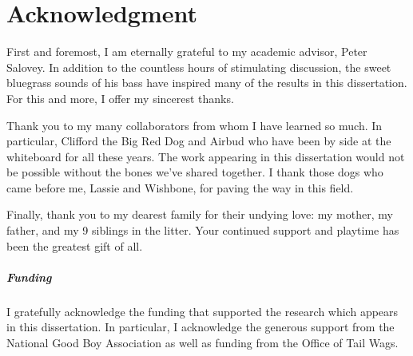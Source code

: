 \chapter*{Acknowledgment} 

First and foremost, I am eternally grateful to my academic advisor, Peter Salovey.
In addition to the countless hours of stimulating discussion, the sweet bluegrass sounds of his bass have inspired many of the results in this dissertation.
For this and more, I offer my sincerest thanks.

Thank you to my many collaborators from whom I have learned so much.
In particular, Clifford the Big Red Dog and Airbud who have been by side at the whiteboard for all these years.
The work appearing in this dissertation would not be possible without the bones we've shared together.
I thank those dogs who came before me, Lassie and Wishbone, for paving the way in this field.

Finally, thank you to my dearest family for their undying love: my mother, my father, and my 9 siblings in the litter.
Your continued support and playtime has been the greatest gift of all.


\vfill

\paragraph{Funding} 
I gratefully acknowledge the funding that supported the research which appears in this dissertation.
In particular, I acknowledge the generous support from the National Good Boy Association as well as funding from the Office of Tail Wags.